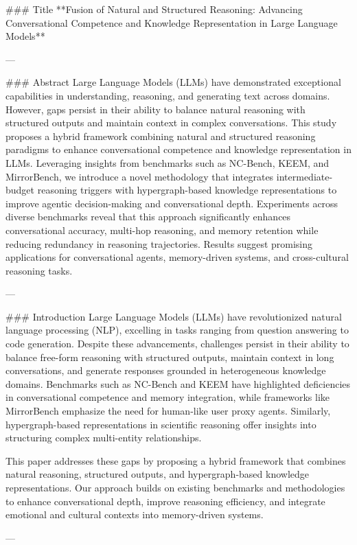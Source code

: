 ### Title  
**Fusion of Natural and Structured Reasoning: Advancing Conversational Competence and Knowledge Representation in Large Language Models**

---

### Abstract  
Large Language Models (LLMs) have demonstrated exceptional capabilities in understanding, reasoning, and generating text across domains. However, gaps persist in their ability to balance natural reasoning with structured outputs and maintain context in complex conversations. This study proposes a hybrid framework combining natural and structured reasoning paradigms to enhance conversational competence and knowledge representation in LLMs. Leveraging insights from benchmarks such as NC-Bench, KEEM, and MirrorBench, we introduce a novel methodology that integrates intermediate-budget reasoning triggers with hypergraph-based knowledge representations to improve agentic decision-making and conversational depth. Experiments across diverse benchmarks reveal that this approach significantly enhances conversational accuracy, multi-hop reasoning, and memory retention while reducing redundancy in reasoning trajectories. Results suggest promising applications for conversational agents, memory-driven systems, and cross-cultural reasoning tasks.  

---

### Introduction  
Large Language Models (LLMs) have revolutionized natural language processing (NLP), excelling in tasks ranging from question answering to code generation. Despite these advancements, challenges persist in their ability to balance free-form reasoning with structured outputs, maintain context in long conversations, and generate responses grounded in heterogeneous knowledge domains. Benchmarks such as NC-Bench and KEEM have highlighted deficiencies in conversational competence and memory integration, while frameworks like MirrorBench emphasize the need for human-like user proxy agents. Similarly, hypergraph-based representations in scientific reasoning offer insights into structuring complex multi-entity relationships.  

This paper addresses these gaps by proposing a hybrid framework that combines natural reasoning, structured outputs, and hypergraph-based knowledge representations. Our approach builds on existing benchmarks and methodologies to enhance conversational depth, improve reasoning efficiency, and integrate emotional and cultural contexts into memory-driven systems.  

---

